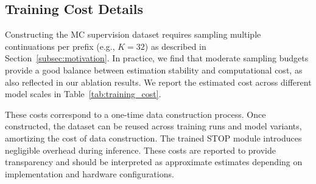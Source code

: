 \documentclass[11pt]{article}
\theoremstyle{plain}
\begin{document}
\subsection{Training Cost Details}
\label{app:training_cost}

Constructing the MC supervision dataset requires sampling multiple continuations per prefix (e.g., $K=32$) as described in Section~\ref{subsec:motivation}.
In practice, we find that moderate sampling budgets provide a good balance between estimation stability and computational cost, as also reflected in our ablation results.
We report the estimated cost across different model scales in Table~\ref{tab:training_cost}.

These costs correspond to a one-time data construction process.
Once constructed, the dataset can be reused across training runs and model variants, amortizing the cost of data construction.
The trained STOP module introduces negligible overhead during inference.
These costs are reported to provide transparency and should be interpreted as approximate estimates depending on implementation and hardware configurations.
\end{document}

